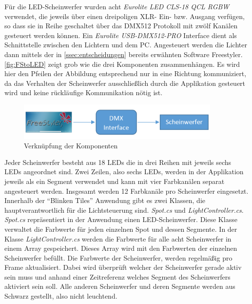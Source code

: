 \label{ssec:DMX}

Für die LED-Scheinwerfer wurden acht \emph{Eurolite LED CLS-18 QCL RGBW} verwendet, die jeweils über einen dreipoligen XLR- Ein- bzw. Ausgang verfügen, so dass sie in Reihe geschaltet über das DMX512 Protokoll mit zwölf Kanälen gesteuert werden können. Ein \emph{Eurolite USB-DMX512-PRO} Interface dient als Schnittstelle zwischen den Lichtern und dem PC. Angesteuert werden die Lichter dann mittels der in \autoref{ssec:entscheidungen} bereits erwähnten Software Freestyler. \autoref{fig:FStoLED} zeigt grob wie die drei Komponenten zusammenhängen. Es wird hier den Pfeilen der Abbildung entsprechend nur in eine Richtung kommuniziert, da das Verhalten der Scheinwerfer ausschließlich durch die Applikation gesteuert wird und keine rückläufige Kommunikation nötig ist.
\begin{figure}[htbp]
	\centering
		\includegraphics[width=0.90\textwidth]{images/FStoDMXInterfaceToLEDs.PNG}
	\caption{Verknüpfung der Komponenten}
	\label{fig:FStoLED}
\end{figure}
Jeder Scheinwerfer besteht aus 18 LEDs die in drei Reihen mit jeweils sechs LEDs angeordnet sind. Zwei Zeilen, also sechs LEDs, werden in der Applikation jeweils als ein Segment verwendet und kann mit vier Farbkanälen separat angesteuert werden. Insgesamt werden 12 Farbkanäle pro Scheinwerfer eingesetzt. Innerhalb der \enquote{Blinken Tiles} Anwendung gibt es zwei Klassen, die hauptverantwortlich für die Lichtsteuerung sind. \emph{Spot.cs} und \emph{LightController.cs}. \emph{Spot.cs} repräsentiert in der Anwendung einen LED-Scheinwerfer. Diese Klasse verwaltet die Farbwerte für jeden einzelnen Spot und dessen Segmente. In der Klasse \emph{LightController.cs} werden die Farbwerte für alle acht Scheinwerfer in einem Array gespeichert. Dieses Array wird mit den Farbwerten der einzelnen Scheinwerfer befüllt. Die Farbwerte der Scheinwerfer, werden regelmäßig pro Frame aktualisiert. Dabei wird überprüft welcher der Scheinwerfer gerade aktiv sein muss und anhand einer Zeitreferenz welches Segment des Scheinwerfers aktiviert sein soll. Alle anderen Scheinwerfer und deren Segmente werden aus Schwarz gestellt, also nicht leuchtend. 

